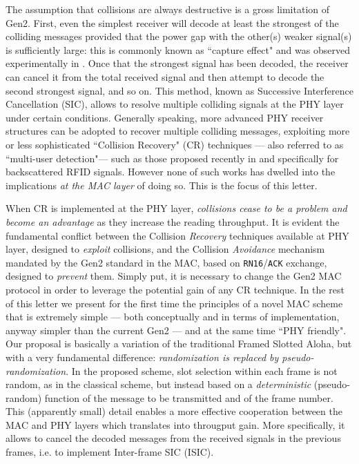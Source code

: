\documentclass[12pt,draftcls,onecolumn]{IEEEtran}
\begin{document}
The assumption that collisions are always destructive is a gross limitation of Gen2.
First, even the simplest receiver will decode at least the strongest of the colliding messages provided that the power gap  with the other(s) weaker signal(s) is sufficiently large: this is commonly known as ``capture effect" and was  observed experimentally in \cite{Buettner11}.
Once that the strongest signal has been decoded, the receiver can cancel it from the total received signal and then attempt to decode the second strongest signal, and so on. This method, known as Successive Interference Cancellation (SIC), allows to resolve multiple colliding signals at the PHY layer under certain conditions.
Generally speaking, more advanced PHY receiver structures can be adopted to recover multiple colliding messages, exploiting more or less sophisticated ``Collision Recovery" (CR) techniques --- also referred to as ``multi-user detection"--- such as those proposed recently in \cite{rupp-collisionrec} and \cite{scaglione} specifically for backscattered RFID signals. However none of such works has dwelled into the implications \emph{at the MAC layer} of doing so. This is the focus of this letter.

When CR is implemented at the PHY layer, \emph{collisions cease to be a problem and become an advantage} as they increase the reading throughput.
It is evident the fundamental conflict between the  Collision \emph{Recovery} techniques available at PHY layer, designed to \emph{exploit} collisions, and the  Collision \emph{Avoidance} mechanism mandated by the Gen2 standard in the MAC, based on \texttt{RN16}/\texttt{ACK} exchange, designed to \emph{prevent} them.
Simply put, it is necessary to change the Gen2 MAC protocol in order to leverage the potential gain of any CR technique. In the rest of this letter we present for the first time the principles of a novel MAC scheme that is extremely simple --- both conceptually and in terms of implementation, anyway simpler than the current Gen2 --- and at the same time ``PHY friendly". Our proposal is basically a variation of the traditional Framed Slotted Aloha, but with a very fundamental difference: \emph{randomization is replaced by pseudo-randomization}.
In the proposed scheme, slot selection within each frame is not random, as in the classical scheme, but instead based on a \emph{deterministic} (pseudo-random) function of the message to be transmitted and of the frame number.
This (apparently small) detail  enables a more effective cooperation between the MAC and PHY layers which translates into througput gain.
More specifically, it allows to cancel the decoded messages from the received signals in the previous frames, i.e. to implement Inter-frame SIC (ISIC).
\end{document}
